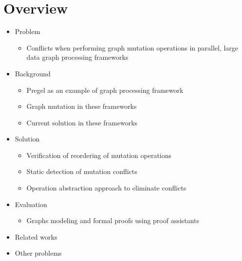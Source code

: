 \section{Overview}
\begin{frame}
\begin{itemize}
  \item Problem
  \begin{itemize}
    \item Conflicts when performing graph mutation operations in parallel,
    large data graph processing frameworks
  \end{itemize}
  \item Background
  \begin{itemize}
    \item Pregel as an example of graph processing framework
    \item Graph mutation in these frameworks
    \item Current solution in these frameworks
  \end{itemize}

  \item Solution
  \begin{itemize}
    \item Verification of reordering of mutation operations
    \item Static detection of mutation conflicts
    \item Operation abstraction approach to eliminate conflicts
  \end{itemize}
  
  \item Evaluation
	  \begin{itemize}
	    \item Graphs modeling and formal proofs using proof assistants 
	  \end{itemize}
  \item Related works
  \item Other problems
\end{itemize}

\end{frame} 

